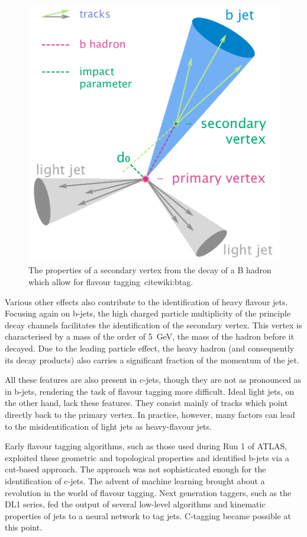 \documentclass[10pt,a4paper]{book}
\begin{document}
\begin{figure}
    \centering
    \includegraphics[width=0.8\linewidth]{atlas/ftag/B-tagging_diagram.png}
    \caption{The properties of a secondary vertex from the decay of a B hadron which allow for flavour tagging~cite{wiki:btag}.}
    \label{fig:svtx}
\end{figure}

Various other effects also contribute to the identification of heavy flavour jets. Focusing again on b-jets, the high charged particle multiplicity of the principle decay channels facilitates the identification of the secondary vertex. This vertex is characterised by a mass of the order of 5~GeV, the mass of the hadron before it decayed. Due to the leading particle effect, the heavy hadron (and consequently its decay products) also carries a significant fraction of the momentum of the jet. 

All these features are also present in c-jets, though they are not as pronounced as in b-jets, rendering the task of flavour tagging more difficult. Ideal light jets, on the other hand, lack these features. They consist mainly of tracks which point directly back to the primary vertex. In practice, however, many factors can lead to the misidentification of light jets as heavy-flavour jets. 

Early flavour tagging algorithms, such as those used during Run 1 of ATLAS, exploited these geometric and topological properties and identified b-jets via a cut-based approach. The approach was not sophisticated enough for the identification of c-jets. The advent of machine learning brought about a revolution in the world of flavour tagging. Next generation taggers, such as the DL1 series, fed the output of several low-level algorithms and kinematic properties of jets to a neural network to tag jets. C-tagging became possible at this point.
\end{document}
